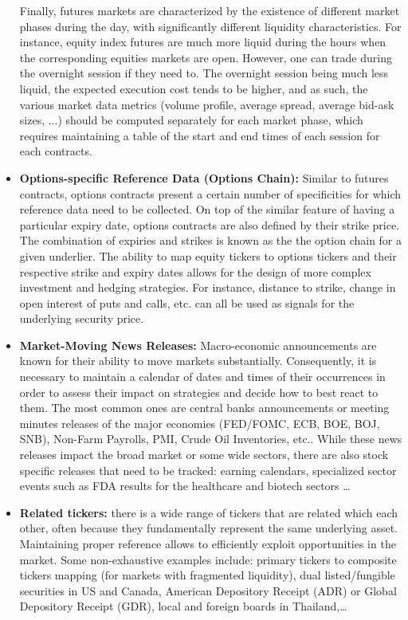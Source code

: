 \begin{itemize}
Finally, futures markets are characterized by the existence of different market phases during the day, with significantly different liquidity characteristics. For instance, equity index futures are much more liquid during the hours when the corresponding equities markets are open. However, one can trade during the overnight session if they need to. The overnight session being much less liquid, the expected execution cost tends to be higher, and as such, the various market data metrics (volume profile, average spread, average bid-ask sizes, ...) should be computed separately for each market phase, which requires maintaining a table of the start and end times of each session for each contracts. 


\item \textbf{Options-specific Reference Data (Options Chain):} Similar to futures contracts, options contracts present a certain number of specificities for which reference data need to be collected. On top of the similar feature of having a particular expiry date, options contracts are also defined by their strike price. The combination of expiries and strikes is known as the the option chain for a given underlier. The ability to map equity tickers to options tickers and their respective strike and expiry dates allows for the design of more complex investment and hedging strategies. For instance, distance to strike, change in open interest of puts and calls, etc. can all be used as signals for the underlying security price.


\item \textbf{Market-Moving News Releases:} Macro-economic announcements are known for their ability to move markets substantially. Consequently, it is necessary to maintain a calendar of dates and times of their occurrences in order to assess their impact on strategies and decide how to best react to them. The most common ones are central banks announcements or meeting minutes releases of the major economies (FED/FOMC, ECB, BOE, BOJ, SNB), Non-Farm Payrolls, PMI, Crude Oil Inventories, etc.. While these news releases impact the broad market or some wide sectors, there are also stock specific releases that need to be tracked: earning calendars, specialized sector events such as FDA results for the healthcare and biotech sectors  \dots 


\item \textbf{Related tickers:} there is a wide range of tickers that are related which each other, often because they fundamentally represent the same underlying asset. Maintaining proper reference allows to efficiently exploit opportunities in the market. Some non-exhaustive examples include: primary tickers to composite tickers mapping (for markets with fragmented liquidity), dual listed/fungible securities in US and Canada, American Depository Receipt (ADR) or Global Depository Receipt (GDR), local and foreign boards in Thailand,\dots 



\end{itemize}
